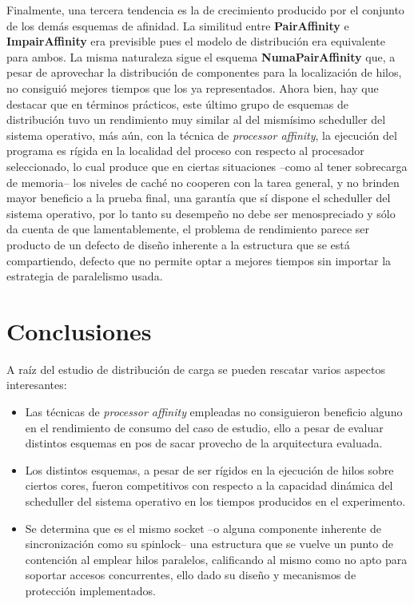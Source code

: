 Finalmente, una tercera tendencia es la de crecimiento producido por el conjunto de los demás esquemas de afinidad. La similitud entre \textbf{PairAffinity} e \textbf{ImpairAffinity} era previsible pues el modelo de distribución era equivalente para ambos. La misma naturaleza sigue el esquema \textbf{NumaPairAffinity} que, a pesar de aprovechar la distribución de componentes para la localización de hilos, no consiguió mejores tiempos que los ya representados. Ahora bien, hay que destacar que en términos prácticos, este último grupo de esquemas de distribución tuvo un rendimiento muy similar al del mismísimo scheduller del sistema operativo, más aún, con la técnica de \emph{processor affinity}, la ejecución del programa es rígida en la localidad del proceso con respecto al procesador seleccionado, lo cual produce que en ciertas situaciones --como al tener sobrecarga de memoria-- los niveles de caché no cooperen con la tarea general, y no brinden mayor beneficio a la prueba final, una garantía que sí dispone el scheduller del sistema operativo, por lo tanto su desempeño no debe ser menospreciado y sólo da cuenta de que lamentablemente, el problema de rendimiento parece ser producto de un defecto de diseño inherente a la estructura que se está compartiendo, defecto que no permite optar a mejores tiempos sin importar la estrategia de paralelismo usada.


\section{Conclusiones}
A raíz del estudio de distribución de carga se pueden rescatar varios aspectos interesantes:
\begin{itemize}
\item Las técnicas de \emph{processor affinity} empleadas no consiguieron beneficio alguno en el rendimiento de consumo del caso de estudio, ello a pesar de evaluar distintos esquemas en pos de sacar provecho de la arquitectura evaluada.
\item Los distintos esquemas, a pesar de ser rígidos en la ejecución de hilos sobre ciertos cores, fueron competitivos con respecto a la capacidad dinámica del scheduller del sistema operativo en los tiempos producidos en el experimento.
\item Se determina que es el mismo socket –o alguna componente inherente de sincronización como su spinlock-- una estructura que se vuelve un punto de contención al emplear hilos paralelos, calificando al mismo como no apto para soportar accesos concurrentes, ello dado su diseño y mecanismos de protección implementados.
\end{itemize}